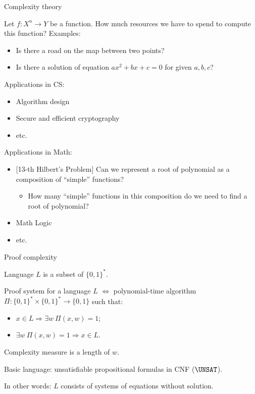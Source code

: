 \begin{frame}{Complexity theory}

    Let $f\colon X^n \to Y$ be a function. How much resources we have to spend to compute this function?
    \pause
    Examples:
    \begin{itemize}
        \item Is there a road on the map between two points?
        \item Is there a solution of equation $a x^2 + b x + c = 0$ for given $a, b, c$?
    \end{itemize}

    \pause

    Applications in CS:
    \begin{itemize}
        \item Algorithm design
        \item Secure and efficient cryptography
        \item etc.
    \end{itemize}


    \pause
    Applications in Math:
    \begin{itemize}
        \item{} [13-th Hilbert's Problem] Can we represent a root of polynomial as a composition of
            ``simple'' functions?
            \begin{itemize}
                \item How many ``simple'' functions in this composition do we need to find a root of
                    polynomial?
            \end{itemize}
        \item Math Logic
        \item etc.
    \end{itemize}
\end{frame}



\begin{frame}{Proof complexity}

    Language $L$ is a subset of $\{0, 1\}^*$.

    \begin{definition}
        Proof system for a language $L$ $\Leftrightarrow$ polynomial-time algorithm $\Pi\colon \{0,
        1\}^* \times \{0, 1\}^* \rightarrow \{0, 1\}$ such that:
        \begin{itemize}
            \item $x \in L \Rightarrow \exists w ~ \Pi(x, w) = 1$;
            \item $\exists w ~ \Pi(x, w) = 1 \Rightarrow x \in L$.
        \end{itemize}
    \end{definition}

    \pause

    Complexity measure is a length of $w$.

    \pause

    Basic language: unsatisfiable propositional formulas in CNF ($\UNSAT$).

    In other words: $L$ consists of systems of equations without solution.

\end{frame}


